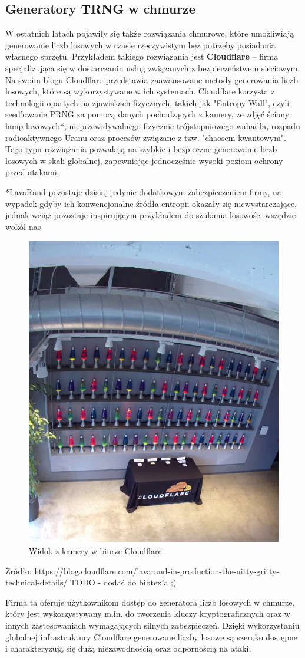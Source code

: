 \subsection{Generatory TRNG w chmurze}

W ostatnich latach pojawiły się także rozwiązania chmurowe, które umożliwiają generowanie liczb losowych w czasie rzeczywistym bez potrzeby posiadania własnego sprzętu. Przykładem takiego rozwiązania jest \textbf{Cloudflare} – firma specjalizująca się w dostarczaniu usług związanych z bezpieczeństwem sieciowym. Na swoim blogu Cloudflare przedstawia zaawansowane metody generowania liczb losowych, które są wykorzystywane w ich systemach.
Cloudflare korzysta z technologii opartych na zjawiskach fizycznych, takich jak "Entropy Wall", czyli seed'owanie PRNG za pomocą danych pochodzących z kamery, ze zdjęć ściany lamp lawowych*,
nieprzewidywalnego fizycznie trójstopniowego wahadła, rozpadu radioaktywnego Uranu oraz procesów związane z tzw. "chaosem kwantowym".
Tego typu rozwiązania pozwalają na szybkie i bezpieczne generowanie liczb losowych w skali globalnej, zapewniając jednocześnie wysoki poziom ochrony przed atakami.

*LavaRand pozostaje dzisiaj jedynie dodatkowym zabezpieczeniem firmy, na wypadek gdyby ich konwencjonalne źródła entropii okazały się niewystarczające, jednak wciąż pozostaje inspirującym przykładem do szukania losowości wszędzie wokół nas.

\begin{figure}[H]
    \centering
    \includegraphics[width=0.4\linewidth]{chapters/02-teoria/figures/lavarandCamera}
    \caption{Widok z kamery w biurze Cloudflare}
    \label{fig:lavarand}
\end{figure}
Źródło: https://blog.cloudflare.com/lavarand-in-production-the-nitty-gritty-technical-details/
TODO - dodać do bibtex'a ;)

Firma ta oferuje użytkownikom dostęp do generatora liczb losowych w chmurze, który jest wykorzystywany
m.in. do tworzenia kluczy kryptograficznych oraz w innych zastosowaniach wymagających silnych zabezpieczeń.
Dzięki wykorzystaniu globalnej infrastruktury Cloudflare generowane liczby losowe są
szeroko dostępne i charakteryzują się dużą niezawodnością oraz odpornością na ataki.


